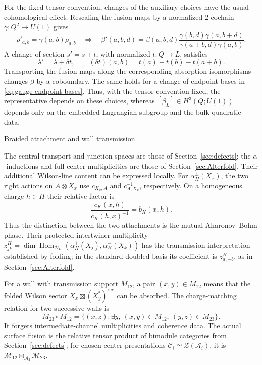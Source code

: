 \documentclass[12pt]{amsart}
\makeatletter
\renewcommand\subsection{\@startsection{subsection}{2}%
  \z@{.5\linespacing\@plus.7\linespacing}{-.5em}%
  {\normalfont\bfseries}}
\numberwithin{equation}{section}
\theoremstyle{definition}
\makeatother
\begin{document}
For the fixed tensor convention, changes of the auxiliary choices
have the usual cohomological effect. Rescaling the fusion maps by
a normalized $2$-cochain $\gamma:Q^2\to U(1)$ gives
\begin{equation}
\label{eq:gauge-beta-basis}
\rho'_{a,b}=\gamma(a,b)\rho_{a,b}
\quad\Longrightarrow\quad
\beta'(a,b,d)=\beta(a,b,d)
\frac{\gamma(b,d)\gamma(a,b+d)}
{\gamma(a+b,d)\gamma(a,b)}.
\end{equation}
A change of section $s'=s+t$, with normalized $t:Q\to L$,
satisfies
\begin{equation}
\label{eq:gauge-section-change}
\lambda'=\lambda+\delta t,\qquad
(\delta t)(a,b)=t(a)+t(b)-t(a+b).
\end{equation}
Transporting the fusion maps along the corresponding absorption
isomorphisms changes $\beta$ by a coboundary. The same holds for
a change of endpoint bases in \eqref{eq:gauge-endpoint-bases}.
Thus, with the tensor convention fixed, the representative depends
on these choices, whereas
$[\beta_L]\in H^3(Q;U(1))$ depends only on the embedded Lagrangian
subgroup and the bulk quadratic data.



\subsection{Braided attachment and wall transmission}

The central transport and junction spaces are those of
Section~\ref{sec:defects}; the $\alpha$-inductions and full-center
multiplicities are those of Section~\ref{sec:Alterfold}.
Their additional Wilson-line content can be expressed locally.
For $\alpha_H^\pm(X_x)$, the two right actions on $A\otimes X_x$
use $c_{X_x,A}$ and $c_{A,X_x}^{-1}$, respectively.
On a homogeneous charge $h\in H$ their relative factor is
\begin{equation}
\label{eq:gauge-alpha-phase}
\frac{c_K(x,h)}{c_K(h,x)^{-1}}=b_K(x,h).
\end{equation}
Thus the distinction between the two attachments is the mutual
Aharonov--Bohm phase. Their protected intertwiner multiplicity
$z^H_{jk}=\dim\operatorname{Hom}_{\mathcal D_H}
(\alpha_H^+(X_j),\alpha_H^-(X_k))$
has the transmission interpretation established by folding;
in the standard doubled basis its coefficient is $z^H_{a,-b}$,
as in Section~\ref{sec:Alterfold}.

For a wall with transmission support $M_{12}$, a pair
$(x,y)\in M_{12}$ means that the folded Wilson sector
$X_x\boxtimes(X_y^*)^{\mathrm{rev}}$ can be absorbed.
The charge-matching relation for two successive walls is
\begin{equation}
\label{eq:gauge-wall-relation}
M_{23}\circ M_{12}
=\{(x,z):\exists y,\ (x,y)\in M_{12},\ (y,z)\in M_{23}\}.
\end{equation}
It forgets intermediate-channel multiplicities and coherence data.
The actual surface fusion is the relative tensor product of
bimodule categories from Section~\ref{sec:defects}; for chosen center
presentations $\mathcal C_i\simeq\mathcal Z(\mathcal A_i)$, it is
$\mathcal M_{12}\boxtimes_{\mathcal A_2}\mathcal M_{23}$.
\end{document}
